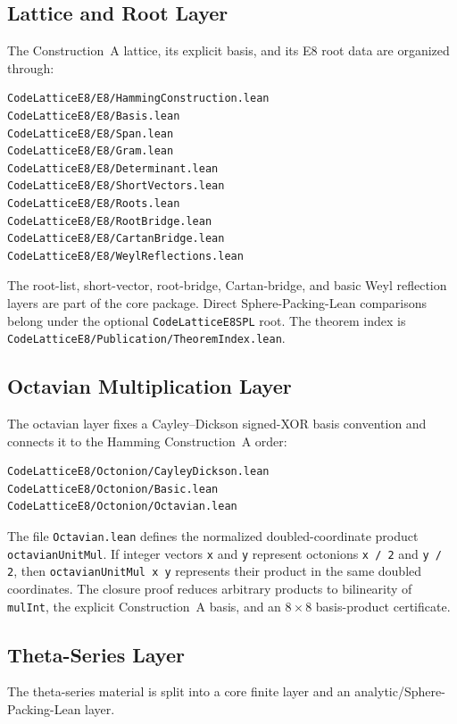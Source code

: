 \documentclass[12pt]{article}
\theoremstyle{definition}
\newcommand{\code}[1]{\texttt{#1}}
\newcommand{\lean}[1]{\texttt{#1}}
\begin{document}
\subsection{Lattice and Root Layer}

The Construction~A lattice, its explicit basis, and its E8 root data are
organized through:
\begin{lstlisting}[style=lean]
CodeLatticeE8/E8/HammingConstruction.lean
CodeLatticeE8/E8/Basis.lean
CodeLatticeE8/E8/Span.lean
CodeLatticeE8/E8/Gram.lean
CodeLatticeE8/E8/Determinant.lean
CodeLatticeE8/E8/ShortVectors.lean
CodeLatticeE8/E8/Roots.lean
CodeLatticeE8/E8/RootBridge.lean
CodeLatticeE8/E8/CartanBridge.lean
CodeLatticeE8/E8/WeylReflections.lean
\end{lstlisting}
The root-list, short-vector, root-bridge, Cartan-bridge, and basic Weyl
reflection layers are part of the core package.  Direct Sphere-Packing-Lean
comparisons belong under the optional \code{CodeLatticeE8SPL} root.  The theorem
index is \code{CodeLatticeE8/Publication/TheoremIndex.lean}.

\subsection{Octavian Multiplication Layer}

The octavian layer fixes a Cayley--Dickson signed-XOR basis convention and
connects it to the Hamming Construction~A order:
\begin{lstlisting}[style=lean]
CodeLatticeE8/Octonion/CayleyDickson.lean
CodeLatticeE8/Octonion/Basic.lean
CodeLatticeE8/Octonion/Octavian.lean
\end{lstlisting}
The file \code{Octavian.lean} defines the normalized doubled-coordinate product
\lean{octavianUnitMul}.  If integer vectors \lean{x} and \lean{y} represent
octonions \lean{x / 2} and \lean{y / 2}, then
\lean{octavianUnitMul x y} represents their product in the same doubled
coordinates.  The closure proof reduces arbitrary products to bilinearity of
\lean{mulInt}, the explicit Construction~A basis, and an $8\times 8$
basis-product certificate.

\subsection{Theta-Series Layer}

The theta-series material is split into a core finite layer and an
analytic/Sphere-Packing-Lean layer.
\end{document}
